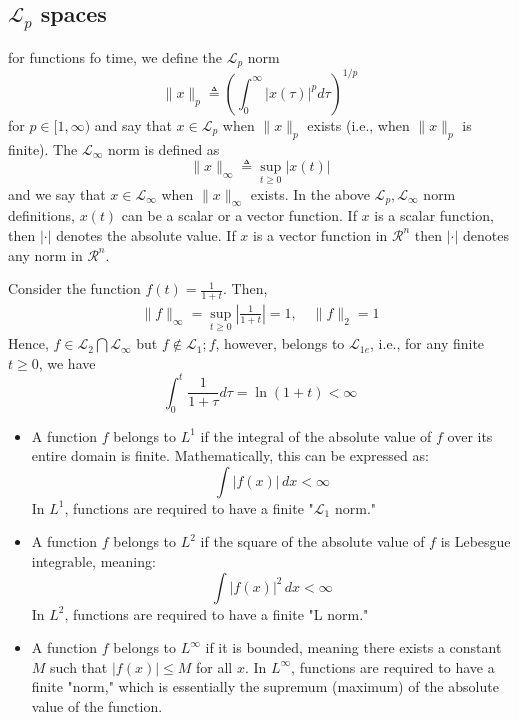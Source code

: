 \documentclass[10pt]{article}
\begin{document}
\begin{multicols*}{2}
\subsection{$\mathcal{L}_p$ spaces}
for functions fo time, we define the $\mathcal{L}_p$ norm
\begin{equation*}
	\|x\|_p \triangleq\left(\int_0^{\infty}|x(\tau)|^p d \tau\right)^{1 / p}
\end{equation*}
for $p \in[1, \infty)$ and say that $x \in \mathcal{L}_p$ when $\|x\|_p$ exists (i.e., when $\|x\|_p$ is finite). The $\mathcal{L}_{\infty}$ norm is defined as
$$
	\|x\|_{\infty} \triangleq \sup _{t \geq 0}|x(t)|
$$
and we say that $x \in \mathcal{L}_{\infty}$ when $\|x\|_{\infty}$ exists.
In the above $\mathcal{L}_p, \mathcal{L}_{\infty}$ norm definitions, $x(t)$ can be a scalar or a vector function. If $x$ is a scalar function, then $|\cdot|$ denotes the absolute value. If $x$ is a vector function in $\mathcal{R}^n$ then $|\cdot|$ denotes any norm in $\mathcal{R}^n$.
\begin{frm-ex}
Consider the function $f(t)=\frac{1}{1+t}$. Then,
$$
	\begin{gathered}
		\|f\|_{\infty}=\sup _{t \geq 0}\left|\frac{1}{1+t}\right|=1, \quad\|f\|_2=1
	\end{gathered}
$$
Hence, $f \in \mathcal{L}_2 \bigcap \mathcal{L}_{\infty}$ but $f \notin \mathcal{L}_1 ; f$, however, belongs to $\mathcal{L}_{1 e}$, i.e., for any finite $t \geq 0$, we have
$$
	\int_0^t \frac{1}{1+\tau} d \tau=\ln (1+t)<\infty
$$
\end{frm-ex}
\begin{itemize}
	\item A function $f$ belongs to $L^1$ if the integral of the absolute value of $f$ over its entire domain is finite. Mathematically, this can be expressed as:
	      \[ \int |f(x)| \, dx < \infty \]
	      In $L^1$, functions are required to have a finite "$\mathcal{L}_1$  norm."
	\item  A function $f$ belongs to $L^2$ if the square of the absolute value of $f$ is Lebesgue integrable, meaning:
	      \[ \int |f(x)|^2 \, dx < \infty \]
	      In $L^2$, functions are required to have a finite "L norm."
	\item A function $f$ belongs to $L^\infty$ if it is bounded, meaning there exists a constant $M$ such that $|f(x)| \leq M$ for all $x$. In $L^\infty$, functions are required to have a finite "norm," which is essentially the supremum (maximum) of the absolute value of the function.
\end{itemize}

\end{multicols*}
\end{document}
